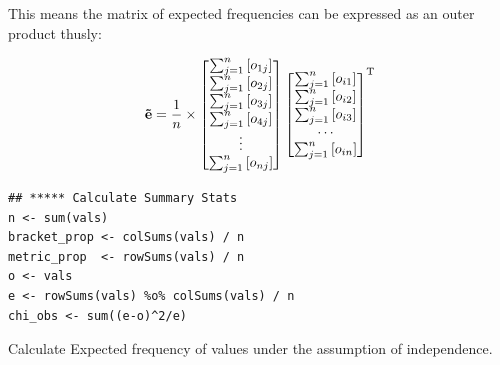 \documentclass[11pt]{article}
\begin{document}
This means the matrix of expected frequencies can be expressed as an outer product thusly:

\begin{align}
\label{eq:org2cf1493}
\mathbf{\vec{e}}= \frac{1}{n} \times \begin{bmatrix} \sum^{n}_{j= 1} \left[ o_{1j} \right] \\  \sum^{n}_{j= 1}
\left[ o_{2j} \right]  \\ \sum^{n}_{j= 1} \left[ o_{3j} \right]   \\
\sum^{n}_{j= 1} \left[ o_{4j} \right]  \\ \vdots  \\
\sum^{n}_{j= 1} \left[ o_{nj} \right]     \end{bmatrix}
\begin{bmatrix}  \sum^{n}_{j= 1} \left[ o_{i1}  \right] \\  \sum^{n}_{j= 1}
\left[ o_{i2}  \right] \\ \sum^{n}_{j= 1} \left[ o_{i3}  \right] \\ \cdots \\
\sum^{n}_{j= 1} \left[ o_{in}  \right]   \end{bmatrix}  ^{\normalsize \mathrm{T}} \label{eq:1}
\end{align}

\begin{listing}[htbp]
\begin{verbatim}
## ***** Calculate Summary Stats
n <- sum(vals)
bracket_prop <- colSums(vals) / n
metric_prop  <- rowSums(vals) / n
o <- vals
e <- rowSums(vals) %o% colSums(vals) / n
chi_obs <- sum((e-o)^2/e)
\end{verbatim}
\caption{\label{orgba15af2}Calculate Expected frequency of values under the assumption of independence.}
\end{listing}
\end{document}
